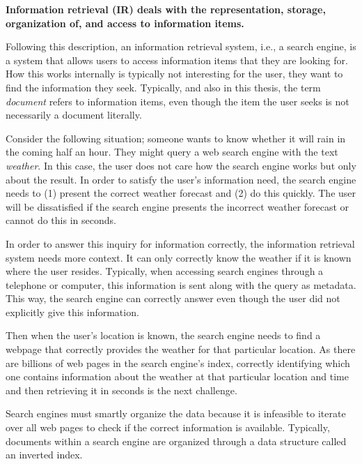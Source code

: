 \medskip
\textbf{Information retrieval (IR) deals with the representation, storage, organization of, and access to information items.}

\medskip
Following this description, an information retrieval system, i.e., a search engine, is a system that allows users to access information items that they are looking for. How this works internally is typically not interesting for the user, they want to find the information they seek. Typically, and also in this thesis, the term \emph{document} refers to information items, even though the item the user seeks is not necessarily a document literally. 

Consider the following situation; someone wants to know whether it will rain in the coming half an hour. They might query a web search engine with the text \emph{weather}. In this case, the user does not care how the search engine works but only about the result. In order to satisfy the user's information need, the search engine needs to (1) present the correct weather forecast and (2) do this quickly. The user will be dissatisfied if the search engine presents the incorrect weather forecast or cannot do this in seconds.

In order to answer this inquiry for information correctly, the information retrieval system needs more context. It can only correctly know the weather if it is known where the user resides. Typically, when accessing search engines through a telephone or computer, this information is sent along with the query as metadata. This way, the search engine can correctly answer even though the user did not explicitly give this information. 

Then when the user's location is known, the search engine needs to find a webpage that correctly provides the weather for that particular location. As there are billions of web pages in the search engine's index, correctly identifying which one contains information about the weather at that particular location and time and then retrieving it in seconds is the next challenge.

Search engines must smartly organize the data because it is infeasible to iterate over all web pages to check if the correct information is available. Typically, documents within a search engine are organized through a data structure called an inverted index.

